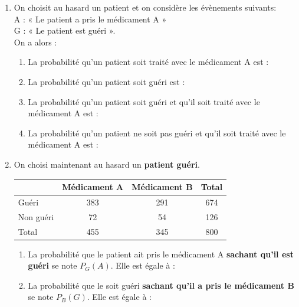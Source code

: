 \documentclass[a4paper,11pt,cours]{nsi} %
\begin{document}
\begin{enumerate}
	\item 	On choisit au hasard un patient et on considère les évènements suivants:\\
	A : « Le patient a pris le médicament A »\\
	G : « Le patient est guéri ».\\
	
	On a alors :
	\begin{enumerate}[label=\textbullet]
		\item 	La probabilité qu'un patient soit traité avec le médicament A est : \\[0.5em]
		\item 	La probabilité qu'un patient soit guéri est : \\[0.5em]
		\item	La probabilité qu'un patient soit guéri et qu'il soit traité avec le médicament A est : \\[0.5em]
		\item	La probabilité qu'un patient ne soit pas guéri et qu'il soit traité avec le médicament A est : \\[0.5em]
	\end{enumerate}
	
	\item 	On choisi maintenant au hasard un \textbf{patient guéri}.
	\begin{center}
		\begin{tabular}{|l|c|c|c|}
			\hline
			& Médicament A & \cellcolor{UGLiOrange}Médicament B & Total\\
			\hline
			\rowcolor{UGLiBlue}Guéri & 383 & \cellcolor{UGLiPurple}291 & 674\\
			\hline
			Non guéri & 72 & \cellcolor{UGLiOrange}54 & 126\\
			\hline
			Total & 455 & \cellcolor{UGLiOrange}345 & 800\\
			\hline
		\end{tabular}
	\end{center}
	\begin{enumerate}[label=\textbullet]
		\item 	La probabilité que le patient ait pris le médicament A \textcolor{UGLiBlue}{\textbf{sachant qu'il est guéri} } se note $P_G(A)$. Elle est égale à :\\[0.5em]
		\item 	La probabilité que le soit guéri \textcolor{UGLiOrange}{\textbf{sachant qu'il a pris le médicament B}} se note $P_B(G)$. Elle est égale à : \\[0.5em]
	\end{enumerate}
\end{enumerate}
\end{document}
